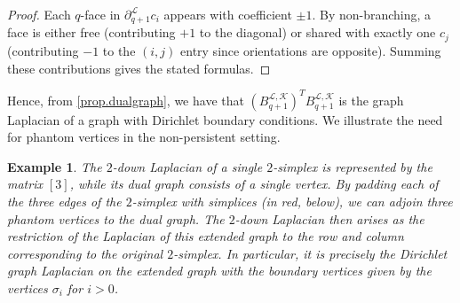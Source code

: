 \documentclass{article}
\newtheorem{example}{Example}[section]
\newcommand{\KK}{\mathcal{K}}
\newcommand{\LL}{\mathcal{L}}
\begin{document}
\begin{proof}
Each $q$-face in $\partial_{q+1}^\LL c_i$ appears with coefficient $\pm1$.  
By non-branching, a face is either free (contributing $+1$ to the diagonal) or shared with exactly one $c_j$ (contributing $-1$ to the $(i,j)$ entry since orientations are opposite). Summing these contributions gives the stated formulas.
\end{proof}

Hence, from \cref{prop.dualgraph}, we have that $(B^{\LL,\KK}_{q+1})^{T} B^{\LL,\KK}_{q+1}$ is the graph Laplacian of a graph with Dirichlet boundary conditions. We illustrate the need for phantom vertices in the non-persistent setting.

\begin{example}
The $2$-down Laplacian of a single $2$-simplex is represented by the matrix $[3]$, while its dual graph consists of a single vertex. By padding each of the three edges of the $2$-simplex with simplices (in red, below), we can adjoin three phantom vertices to the dual graph. The $2$-down Laplacian then arises as the restriction of the Laplacian of this extended graph to the row and column corresponding to the original $2$-simplex. In particular, it is precisely the Dirichlet graph Laplacian on the extended graph with the boundary vertices given by the vertices $\sigma_i$ for $i>0$.
\end{example}
\begin{center}
\end{center}
\end{document}
